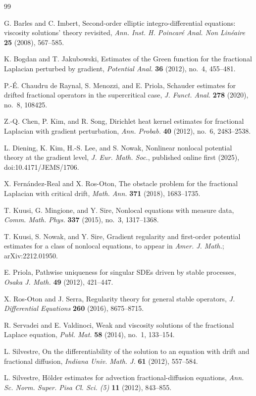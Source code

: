 \documentclass[reqno]{amsart}
\numberwithin{equation}{section}
\theoremstyle{plain}
\theoremstyle{definition}
\theoremstyle{remark}
\begin{document}
\begin{thebibliography}{99}

G. Barles and C. Imbert,
Second-order elliptic integro-differential equations: viscosity solutions'
theory revisited,
\emph{Ann. Inst. H. Poincar\'e Anal. Non Lin\'eaire} \textbf{25} (2008),
567--585.

K. Bogdan and T. Jakubowski,
Estimates of the Green function for the fractional Laplacian perturbed by
gradient,
\emph{Potential Anal.} \textbf{36} (2012), no.~4, 455--481.

P.-\'E. Chaudru de Raynal, S. Menozzi, and E. Priola,
Schauder estimates for drifted fractional operators in the supercritical
case,
\emph{J. Funct. Anal.} \textbf{278} (2020), no.~8, 108425.

Z.-Q. Chen, P. Kim, and R. Song,
Dirichlet heat kernel estimates for fractional Laplacian with gradient
perturbation,
\emph{Ann. Probab.} \textbf{40} (2012), no.~6, 2483--2538.

L. Diening, K. Kim, H.-S. Lee, and S. Nowak,
Nonlinear nonlocal potential theory at the gradient level,
\emph{J. Eur. Math. Soc.}, published online first (2025),
doi:10.4171/JEMS/1706.

X. Fern\'andez-Real and X. Ros-Oton,
The obstacle problem for the fractional Laplacian with critical drift,
\emph{Math. Ann.} \textbf{371} (2018), 1683--1735.

T. Kuusi, G. Mingione, and Y. Sire,
Nonlocal equations with measure data,
\emph{Comm. Math. Phys.} \textbf{337} (2015), no.~3, 1317--1368.

T. Kuusi, S. Nowak, and Y. Sire,
Gradient regularity and first-order potential estimates for a class of
nonlocal equations,
to appear in \emph{Amer. J. Math.}; arXiv:2212.01950.

E. Priola,
Pathwise uniqueness for singular SDEs driven by stable processes,
\emph{Osaka J. Math.} \textbf{49} (2012), 421--447.

X. Ros-Oton and J. Serra,
Regularity theory for general stable operators,
\emph{J. Differential Equations} \textbf{260} (2016), 8675--8715.

R. Servadei and E. Valdinoci,
Weak and viscosity solutions of the fractional Laplace equation,
\emph{Publ. Mat.} \textbf{58} (2014), no.~1, 133--154.

L. Silvestre,
On the differentiability of the solution to an equation with drift and
fractional diffusion,
\emph{Indiana Univ. Math. J.} \textbf{61} (2012), 557--584.

L. Silvestre,
H\"older estimates for advection fractional-diffusion equations,
\emph{Ann. Sc. Norm. Super. Pisa Cl. Sci. (5)} \textbf{11} (2012), 843--855.

\end{thebibliography}
\end{document}
